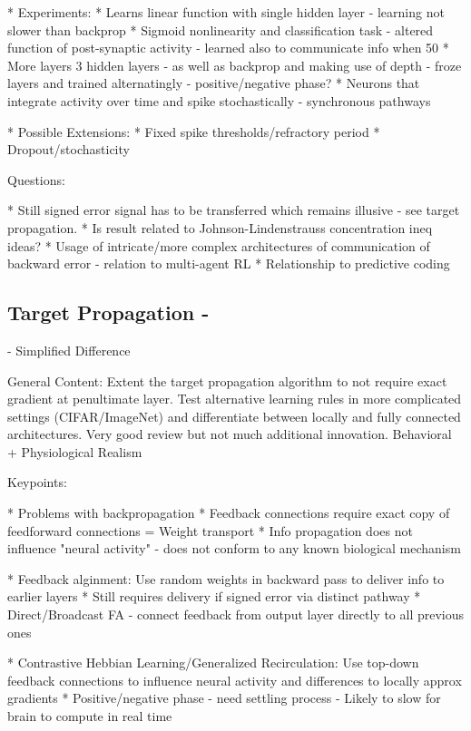 \documentclass{article}
\theoremstyle{definition}
\begin{document}
* Experiments:
    * Learns linear function with single hidden layer - learning not slower than backprop
    * Sigmoid nonlinearity and classification task - altered function of post-synaptic activity - learned also to communicate info when 50%
    * More layers 3 hidden layers - as well as backprop and making use of depth - froze layers and trained alternatingly - positive/negative phase?
    * Neurons that integrate activity over time and spike stochastically - synchronous pathways

* Possible Extensions:
    * Fixed spike thresholds/refractory period
    * Dropout/stochasticity

Questions:

* Still signed error signal has to be transferred which remains illusive - see target propagation.
* Is result related to Johnson-Lindenstrauss concentration ineq ideas?
* Usage of intricate/more complex architectures of communication of backward error - relation to multi-agent RL
* Relationship to predictive coding


\subsection*{Target Propagation - \citet{lee2015, bartunov2018}}


\citet{bartunov2018} - Simplified Difference

General Content: Extent the target propagation algorithm to not require exact gradient at penultimate layer. Test alternative learning rules in more complicated settings (CIFAR/ImageNet) and differentiate between locally and fully connected architectures. Very good review but not much additional innovation. Behavioral + Physiological Realism


Keypoints:

* Problems with backpropagation
    * Feedback connections require exact copy of feedforward connections = Weight transport
    * Info propagation does not influence "neural activity" - does not conform to any known biological mechanism

* Feedback alginment: Use random weights in backward pass to deliver info to earlier layers
    * Still requires delivery if signed error via distinct pathway
    * Direct/Broadcast FA - connect feedback from output layer directly to all previous ones

* Contrastive Hebbian Learning/Generalized Recirculation: Use top-down feedback connections to influence neural activity and differences to locally approx gradients
    * Positive/negative phase - need settling process - Likely to slow for brain to compute in real time
\end{document}
